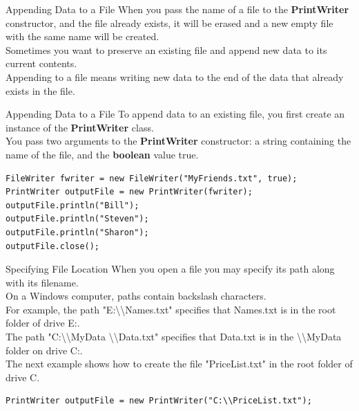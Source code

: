 \documentclass[11pt]{beamer}
\begin{document}
\begin{frame}{Appending Data to a File}
    When you pass the name of a file to the \textbf{PrintWriter} constructor, and the file already exists, it will be erased and a new empty file with the same name will be created. \\ 
    \vspace{1em} 
    Sometimes you want to preserve an existing file and append new data to its current contents. \\ 
    \vspace{1em} 
    Appending to a file means writing new data to the end of the data that already exists in the file.
\end{frame}

\begin{frame}[fragile]{Appending Data to a File}
    To append data to an existing file, you first create an instance of the \textbf{PrintWriter} class. \\ 
    \vspace{1em} 
    You pass two arguments to the \textbf{PrintWriter} constructor: a string containing the name of the file, and the \textbf{boolean} value true.
    \begin{lstlisting}
FileWriter fwriter = new FileWriter("MyFriends.txt", true);
PrintWriter outputFile = new PrintWriter(fwriter);
outputFile.println("Bill");
outputFile.println("Steven");
outputFile.println("Sharon");
outputFile.close();
    \end{lstlisting}
\end{frame}

\begin{frame}[fragile]{Specifying File Location}
When you open a file you may specify its path along with its filename. \\ 
\vspace{1em} 
On a Windows computer, paths contain backslash characters. \\ 
\vspace{1em} 
For example, the path "E:\textbackslash \textbackslash Names.txt" specifies that Names.txt is in the root folder of drive E:. \\ 
\vspace{1em} 
The path "C:\textbackslash \textbackslash MyData \textbackslash \textbackslash Data.txt" specifies that Data.txt is in the \textbackslash \textbackslash MyData folder on drive C:. \\ 
\vspace{1em}
The next example shows how to create the file "PriceList.txt" in the root folder of drive C.
\begin{lstlisting}
PrintWriter outputFile = new PrintWriter("C:\\PriceList.txt");
\end{lstlisting}
\end{frame}
\end{document}
